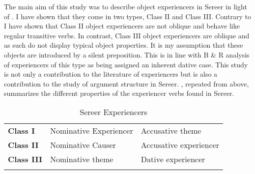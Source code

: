 \documentclass[output=paper]{langscibook}
\begin{document}
The main aim of this study was to describe object experiencers in Sereer in light of \citet{Belletti1988} .  I have shown that they come in two types, Class II and Class III. Contrary to \citet{Landau2010} I have shown that Class II object experiencers are not oblique and behave like regular transitive verbs. In contrast, Class III object experiencers are oblique and as such do not display typical object properties. It is my assumption that these objects are introduced by a silent preposition. This is in line with B \& R analysis of experiencers of this type as being assigned an inherent dative case. This study is not only a contribution to the literature of experiencers but is also a contribution to the study of argument structure in Sereer. , repeated from above, summarizes the different properties of the experiencer verbs found in Sereer.

\begin{table}
\caption{\label{tab:tamba:3}Sereer Experiencers}
\begin{tabular}{lll}
\lsptoprule
\textbf{Class I} & Nominative Experiencer & Accusative theme\\
\textbf{Class II} & Nominative Causer & Accusative experiencer\\
\textbf{Class III} & Nominative theme & Dative experiencer\\
\lspbottomrule
\end{tabular}
\end{table}

 






\end{document}
